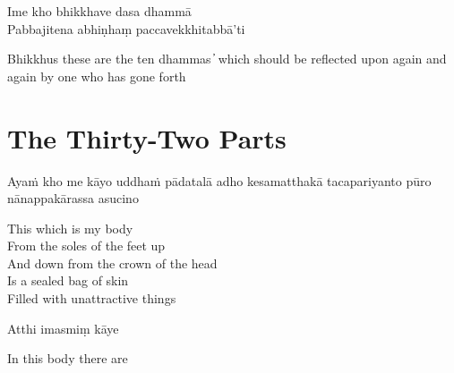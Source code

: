 Ime kho bhikkhave dasa dhammā\\
Pabbajitena abhiṇhaṃ paccavekkhitabbā'ti

\begin{english}
  Bhikkhus these are the ten dhammas  ̓  which should be reflected upon again and again by one who has gone forth
\end{english}


\clearpage

\section{The Thirty-Two Parts}

\begin{leader}
\end{leader}

Ayaṁ kho me kāyo uddhaṁ pādatalā adho kesamatthakā tacapariyanto pūro nānappakārassa asucino

\begin{english}
  This which is my body\\
  From the soles of the feet up\\
  And down from the crown of the head\\
  Is a sealed bag of skin\\
  Filled with unattractive things
\end{english}

Atthi imasmiṃ kāye

\begin{english}
  In this body there are
\end{english}


